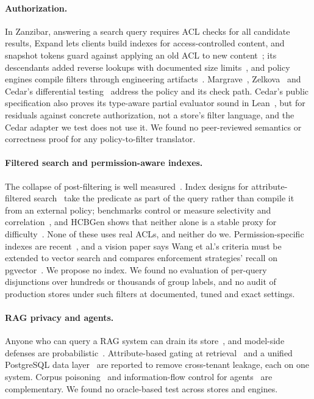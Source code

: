 \paragraph{Authorization.}
In Zanzibar, answering a search query requires ACL checks for all candidate results, Expand lets clients build indexes for access-controlled content, and snapshot tokens guard against applying an old ACL to new content~\cite{pang2019zanzibar}; its descendants added reverse
lookups with documented size limits~\cite{openfga2026search,authzed2026protecting}, and policy engines compile filters through engineering
artifacts~\cite{opa2026evaluating,cerbos2026cerbos}. Margrave~\cite{fisler2005verification}, Zelkova~\cite{backes2018semanticbased} and Cedar's
differential testing~\cite{disselkoen2024how} address the policy and its check path. Cedar's public specification also proves its type-aware partial evaluator sound in Lean~\cite{cedar2026cedarspec}, but for residuals against concrete authorization, not a store's filter language, and the Cedar adapter we test does not use it. We found no peer-reviewed semantics or correctness proof for
any policy-to-filter translator.

\paragraph{Filtered search and permission-aware indexes.}
The collapse of post-filtering is well measured~\cite{patel2024acorn,li2025attribute,kim2026racorn1}. Index designs for attribute-filtered
search~\cite{wang2023efficient,gollapudi2023filtereddiskann,cai2024navigating} take the predicate as part of the query rather than compile it from an
external policy; benchmarks control or measure selectivity and correlation~\cite{zhang2026vecbench,amanbayev2026filtered}, and HCBGen shows that neither alone is a
stable proxy for difficulty~\cite{lim2026revisiting}. None of these uses real ACLs, and neither do we. Permission-specific indexes are recent~\cite{zhong2026honeybee,han2026dont}, and a
vision paper says Wang et al.'s criteria must be extended to vector search and compares enforcement strategies' recall on pgvector~\cite{yalamarthi2026policyaware}. We propose no index. We found no evaluation of per-query disjunctions over hundreds
or thousands of group labels, and no audit of production stores under such filters at documented, tuned and exact settings.

\paragraph{RAG privacy and agents.}
Anyone who can query a RAG system can drain its store~\cite{zeng2024good,qi2024follow}, and model-side defenses are
probabilistic~\cite{bhatt2025enterprise}. Attribute-based gating at retrieval~\cite{arceo2026securing} and a unified PostgreSQL data layer~\cite{budigi2026beyond} are reported to remove cross-tenant leakage, each on one system. Corpus
poisoning~\cite{zou2025poisonedrag} and information-flow control for agents~\cite{costa2025securing} are complementary. We found no oracle-based test across stores and engines.

